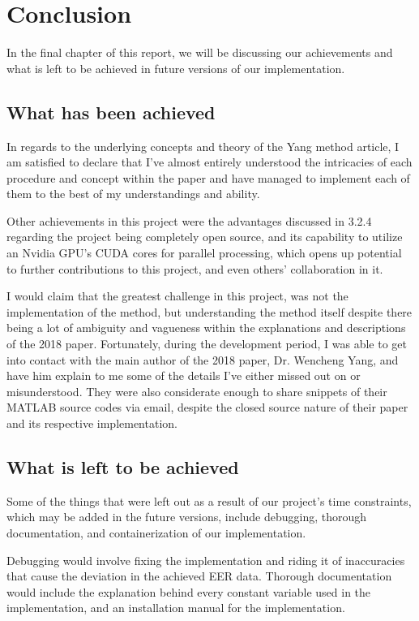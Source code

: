 \documentclass[fyp]{socreport}
\begin{document}
\chapter{Conclusion}
In the final chapter of this report, we will be discussing our achievements and what is left to be achieved in future versions of our implementation.

\section{What has been achieved}
In regards to the underlying concepts and theory of the Yang method article, I am satisfied to declare that I've almost entirely understood the intricacies of each procedure and concept within the paper and have managed to implement each of them to the best of my understandings and ability.

Other achievements in this project were the advantages discussed in 3.2.4 regarding the project being completely open source, and its capability to utilize an Nvidia GPU's CUDA cores for parallel processing, which opens up potential to further contributions to this project, and even others' collaboration in it.

I would claim that the greatest challenge in this project, was not the implementation of the method, but understanding the method itself despite there being a lot of ambiguity and vagueness within the explanations and descriptions of the 2018 paper. Fortunately, during the development period, I was able to get into contact with the main author of the 2018 paper, Dr. Wencheng Yang, and have him explain to me some of the details I've either missed out on or misunderstood. They were also considerate enough to share snippets of their MATLAB source codes via email, despite the closed source nature of their paper and its respective implementation.

\section{What is left to be achieved}
Some of the things that were left out as a result of our project's time constraints, which may be added in the future versions, include debugging, thorough documentation, and containerization of our implementation. 

Debugging would involve fixing the implementation and riding it of inaccuracies that cause the deviation in the achieved EER data. Thorough documentation would include the explanation behind every constant variable used in the implementation, and an installation manual for the implementation.
\end{document}
